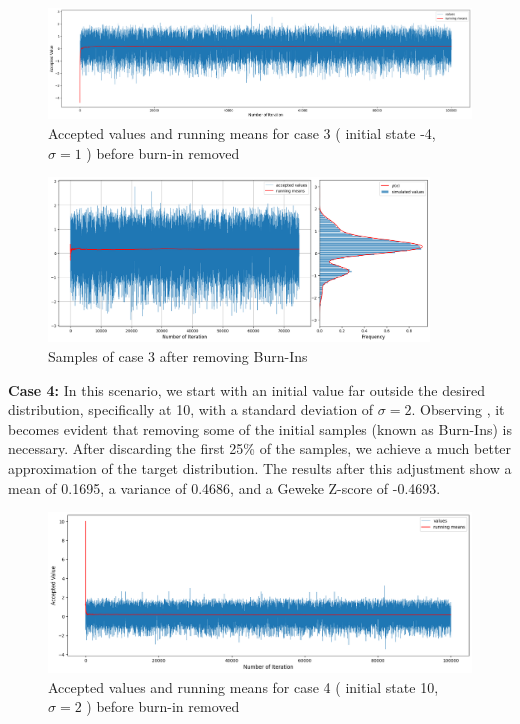 \begin{example}
    \begin{figure}[H]
        \centering
        \includegraphics[width=1\textwidth]{./images/metropolis/example1/sample-3-values.png}
        \caption{Accepted values and running means for case 3 ( initial state -4, $ \sigma = 1 $ ) before burn-in removed}
        \label{fig:MH sample3}
    \end{figure}

    \begin{figure}[H]
        \centering
        \includegraphics[width=0.9\textwidth]{./images/metropolis/example1/sample-3-value-hist-bo.png}
        \caption{Samples of case 3 after removing Burn-Ins}
        \label{fig:MH sample3 after burn in}
    \end{figure}

    \textbf{Case 4:} In this scenario, we start with an initial value far outside the desired distribution, specifically at 10, with a standard deviation of $\sigma = 2$. Observing , it becomes evident that removing some of the initial samples (known as Burn-Ins) is necessary. After discarding the first 25\% of the samples, we achieve a much better approximation of the target distribution. The results after this adjustment show a mean of 0.1695, a variance of 0.4686, and a Geweke Z-score of -0.4693.

    \begin{figure}[H]
        \centering
        \includegraphics[width=1\textwidth]{./images/metropolis/example1/sample-4-values.png}
        \caption{Accepted values and running means for case 4 ( initial state 10, $ \sigma = 2 $ ) before burn-in removed}
        \label{fig:MH sample4}
    \end{figure}


\end{example}
